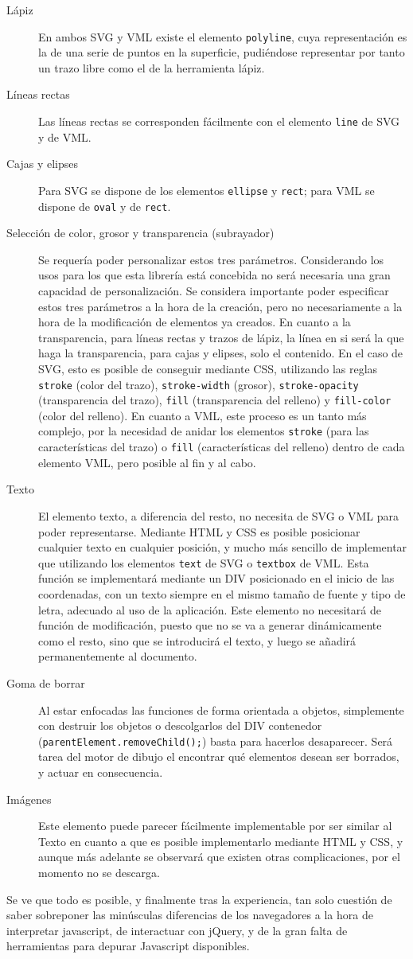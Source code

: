 \begin{description}
  \item[Lápiz] En ambos SVG y VML existe el elemento \texttt{polyline}, cuya representación es la de una serie de puntos en la superficie, pudiéndose representar por tanto un trazo libre como el de la herramienta lápiz.
  \item[Líneas rectas] Las líneas rectas se corresponden fácilmente con el elemento \texttt{line} de SVG y de VML. 
  \item[Cajas y elipses] Para SVG se dispone de los elementos \texttt{ellipse} y \texttt{rect}; para VML se dispone de \texttt{oval} y de \texttt{rect}.
  \item[Selección de color, grosor y transparencia (subrayador)] Se requería poder personalizar estos tres parámetros. Considerando los usos para los que esta librería está concebida no será necesaria una gran capacidad de personalización. Se considera importante poder especificar estos tres parámetros a la hora de la creación, pero no necesariamente a la hora de la modificación de elementos ya creados. En cuanto a la transparencia, para líneas rectas y trazos de lápiz, la línea en si será la que haga la transparencia, para cajas y elipses, solo el contenido. En el caso de SVG, esto es posible de conseguir mediante CSS, utilizando las reglas \texttt{stroke} (color del trazo), \texttt{stroke-width} (grosor), \texttt{stroke-opacity} (transparencia del trazo), \texttt{fill} (transparencia del relleno) y \texttt{fill-color} (color del relleno). En cuanto a VML, este proceso es un tanto más complejo, por la necesidad de anidar los elementos \texttt{stroke} (para las características del trazo) o \texttt{fill} (características del relleno) dentro de cada elemento VML, pero posible al fin y al cabo.
  \item[Texto] El elemento texto, a diferencia del resto, no necesita de SVG o VML para poder representarse. Mediante HTML y CSS es posible posicionar cualquier texto en cualquier posición, y mucho más sencillo de implementar que utilizando los elementos \texttt{text} de SVG o \texttt{textbox} de VML. Esta función se implementará mediante un DIV posicionado en el inicio de las coordenadas, con un texto siempre en el mismo tamaño de fuente y tipo de letra, adecuado al uso de la aplicación. Este elemento no necesitará de función de modificación, puesto que no se va a generar dinámicamente como el resto, sino que se introducirá el texto, y luego se añadirá permanentemente al documento.
  \item[Goma de borrar] Al estar enfocadas las funciones de forma orientada a objetos, simplemente con destruir los objetos o descolgarlos del DIV contenedor (\texttt{parentElement.removeChild();}) basta para hacerlos desaparecer. Será tarea del motor de dibujo el encontrar qué elementos desean ser borrados, y actuar en consecuencia.
  \item[Imágenes] Este elemento puede parecer fácilmente implementable por ser similar al Texto en cuanto a que es posible implementarlo mediante HTML y CSS, y aunque más adelante se observará que existen otras complicaciones, por el momento no se descarga.
\end{description}

Se ve que todo es posible, y finalmente tras la experiencia, tan solo cuestión de saber sobreponer las minúsculas diferencias de los navegadores a la hora de interpretar javascript, de interactuar con jQuery, y de la gran falta de herramientas para depurar Javascript disponibles.